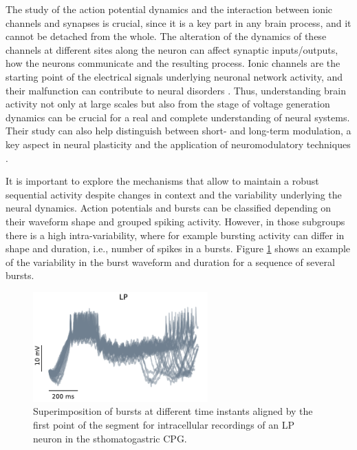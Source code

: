 The study of the action potential dynamics and the interaction between ionic channels and synapses is crucial, since it is a key part in any brain process, and it cannot be detached from the whole. The alteration of the dynamics of these channels at different sites along the neuron can affect synaptic inputs/outputs, how the neurons communicate and the resulting process. Ionic channels are the starting point of the electrical signals underlying neuronal network activity, and their malfunction can contribute to neural disorders \parencite{kecskes_editorial_2023}. Thus, understanding brain activity not only at large scales but also from the stage of voltage generation dynamics can be crucial for a real and complete understanding of neural systems. Their study can also help distinguish between short- and long-term modulation, a key aspect in neural plasticity and the application of neuromodulatory techniques \parencite{chambers_light-activated_2008,burke_modulation_2019}.

 
It is important to explore the mechanisms that allow to maintain a robust sequential activity despite changes in context and the variability underlying the neural dynamics. Action potentials and bursts can be classified depending on their waveform shape and grouped spiking activity. However, in those subgroups there is a high intra-variability, where for example bursting activity can differ in shape and duration, i.e., number of spikes in a bursts. Figure \ref{fig:burst variability} shows an example of the variability in the burst waveform and duration for a sequence of several bursts. 


\begin{figure}[htb!]
	\centering
	\includegraphics[width=0.6\textwidth]{img/intro/burst_variability.pdf}
	\caption{Superimposition of bursts at different time instants aligned by the first point of the segment for intracellular recordings of an LP neuron in the sthomatogastric CPG.}
	\label{fig:burst variability}
\end{figure}



